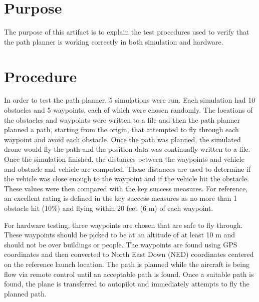 \documentclass[]{auvsi_doc}
\begin{document}
\begin{AUVSITitlePage}
\begin{artifacttable}
\end{artifacttable}
\end{AUVSITitlePage}

\section*{Purpose}

The purpose of this artifact is to explain the test procedures used to verify that the path planner is working correctly in both simulation and hardware.

\section*{Procedure}

In order to test the path planner, 5 simulations were run. Each simulation had 10 obstacles and 5 waypoints, each of which were chosen randomly.
The locations of the obstacles and waypoints were written to a file and then the path planner planned a path, starting from the origin, that attempted to fly through each waypoint and avoid each obstacle.
Once the path was planned, the simulated drone would fly the path and the position data was continually written to a file. Once the simulation finished, the distances between the waypoints and vehicle and obstacle and vehicle are computed.
These distances are used to determine if the vehicle was close enough to the waypoint and if the vehicle hit the obstacle.
These values were then compared with the key success measures. For reference, an excellent rating is defined in the key success measures as no more than 1 obstacle hit (10\%) and flying within 20 feet (6 m) of each waypoint.

For hardware testing, three waypoints are chosen that are safe to fly through. These waypoints should be picked to be at an altitude of at least 10 m and should not be over buildings or people. The waypoints are found using GPS coordinates and then converted to North East Down (NED) coordinates centered on the reference launch location. The path is planned while the aircraft is being flow via remote control until an acceptable path is found. Once a suitable path is found, the plane is transferred to autopilot and immediately attempts to fly the planned path.
\end{document}
